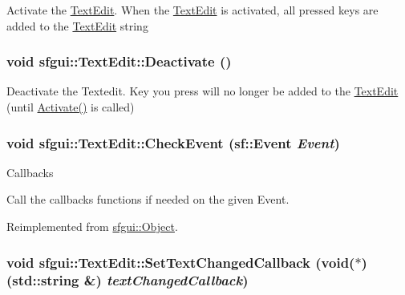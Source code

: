 Activate the \hyperlink{classsfgui_1_1TextEdit}{TextEdit}. When the \hyperlink{classsfgui_1_1TextEdit}{TextEdit} is activated, all pressed keys are added to the \hyperlink{classsfgui_1_1TextEdit}{TextEdit} string \hypertarget{classsfgui_1_1TextEdit_49b0919fd6c43c35913f8a46a6788270}{
\subsubsection[Deactivate]{\setlength{\rightskip}{0pt plus 5cm}void sfgui::TextEdit::Deactivate ()}}
\label{classsfgui_1_1TextEdit_49b0919fd6c43c35913f8a46a6788270}




Deactivate the Textedit. Key you press will no longer be added to the \hyperlink{classsfgui_1_1TextEdit}{TextEdit} (until \hyperlink{classsfgui_1_1TextEdit_bcd256e053ae8f13a5c7f919f79c03c9}{Activate()} is called) \hypertarget{classsfgui_1_1TextEdit_af6d4be3633d3eb8bcc7a1007e324da8}{
\subsubsection[CheckEvent]{\setlength{\rightskip}{0pt plus 5cm}void sfgui::TextEdit::CheckEvent (sf::Event {\em Event})}}
\label{classsfgui_1_1TextEdit_af6d4be3633d3eb8bcc7a1007e324da8}


Callbacks 

Call the callbacks functions if needed on the given Event. 

Reimplemented from \hyperlink{classsfgui_1_1Object_cd9dbf2abe79e04c22f281bccb8bdb0e}{sfgui::Object}.\hypertarget{classsfgui_1_1TextEdit_2c80f417ea995a6452fcb47740701e1e}{
\subsubsection[SetTextChangedCallback]{\setlength{\rightskip}{0pt plus 5cm}void sfgui::TextEdit::SetTextChangedCallback (void($\ast$)(std::string \&) {\em textChangedCallback})}}
\label{classsfgui_1_1TextEdit_2c80f417ea995a6452fcb47740701e1e}




